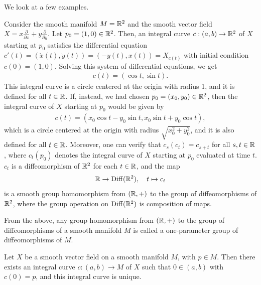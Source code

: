 We look at a few examples.
\begin{example}
    Consider the smooth manifold $M = \mathbb{R}^{2}$ and the smooth vector field $X = x \frac{\partial}{\partial x} + y \frac{\partial}{\partial y}$. Let $p_{0} = (1,0) \in \mathbb{R}^{2}$. Then, an integral curve $c:(a,b) \to \mathbb{R}^{2}$ of $X$ starting at $p_{0}$ satisfies the differential equation $c'(t) = (\dot{x}(t),\dot{y}(t)) = (-y(t),x(t)) = X_{c(t)}$ with initial condition $c(0) = (1,0)$. Solving this system of differential equations, we get
    \begin{align}
        c(t) = (\cos t, \sin t).
    \end{align}
    This integral curve is a circle centered at the origin with radius 1, and it is defined for all $t \in \mathbb{R}$. If, instead, we had chosen $p_{0} = (x_{0},y_{0}) \in \mathbb{R}^{2}$, then the integral curve of $X$ starting at $p_{0}$ would be given by
    \begin{align}
        c(t) = (x_{0}\cos t - y_{0}\sin t, x_{0}\sin t + y_{0}\cos t),
    \end{align}
    which is a circle centered at the origin with radius $\sqrt{x_{0}^{2} + y_{0}^{2}}$, and it is also defined for all $t \in \mathbb{R}$. Moreover, one can verify that $c_{s}(c_{t}) = c_{s+t}$ for all $s,t \in \mathbb{R}$, where $c_{t}(p_{0})$ denotes the integral curve of $X$ starting at $p_{0}$ evaluated at time $t$. $c_{t}$ is a diffeomorphism of $\mathbb{R}^{2}$ for each $t \in \mathbb{R}$, and the map
    \begin{align}
        \mathbb{R} \to \mathrm{Diff}(\mathbb{R}^{2}), \quad t \mapsto c_{t}
    \end{align}
    is a smooth group homomorphism from $(\mathbb{R},+)$ to the group of diffeomorphisms of $\mathbb{R}^{2}$, where the group operation on $\mathrm{Diff}(\mathbb{R}^{2})$ is composition of maps. 
\end{example}

From the above, any group homomorphism from $(\mathbb{R},+)$ to the group of diffeomorphisms of a smooth manifold $M$ is called a one-parameter group of diffeomorphisms of $M$.

\begin{corollary}
    Let $X$ be a smooth vector field on a smooth manifold $M$, with $p \in M$. Then there exists an integral curve $c:(a,b) \to M$ of $X$ such that $0 \in (a,b)$ with $c(0) = p$, and this integral curve is unique.
\end{corollary}

